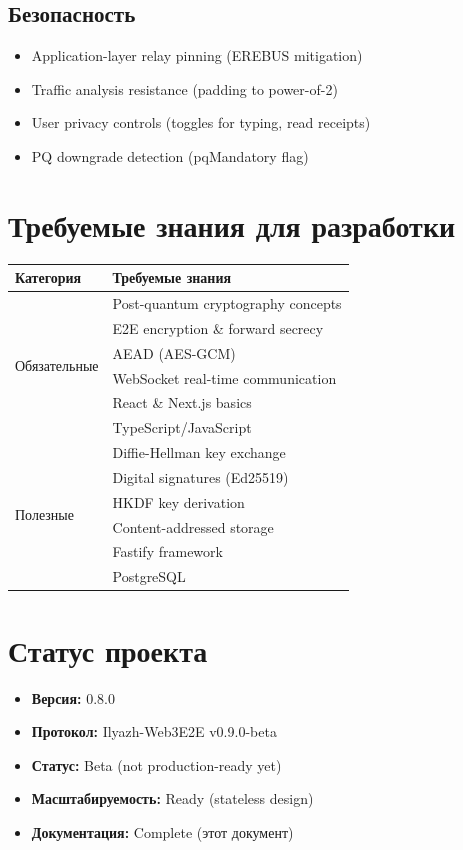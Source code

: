 \documentclass[11pt,a4paper,oneside]{book}
\begin{document}
\vspace{-0.2cm}\subsection{Безопасность}
\begin{itemize}
  \item Application-layer relay pinning (EREBUS mitigation)
  \item Traffic analysis resistance (padding to power-of-2)
  \item User privacy controls (toggles for typing, read receipts)
  \item PQ downgrade detection (pqMandatory flag)
\end{itemize}
\vspace{-0.3cm}\section{Требуемые знания для разработки}
\begin{table}[h]
\centering
\begin{tabular}{|l|l|}
\hline
\textbf{Категория} & \textbf{Требуемые знания} \\
\hline
\multirow{6}{*}{Обязательные} & Post-quantum cryptography concepts \\
& E2E encryption \& forward secrecy \\
& AEAD (AES-GCM) \\
& WebSocket real-time communication \\
& React \& Next.js basics \\
& TypeScript/JavaScript \\
\hline
\multirow{6}{*}{Полезные} & Diffie-Hellman key exchange \\
& Digital signatures (Ed25519) \\
& HKDF key derivation \\
& Content-addressed storage \\
& Fastify framework \\
& PostgreSQL \\
\hline
\end{tabular}
\end{table}
\vspace{-0.3cm}\section{Статус проекта}
\begin{itemize}
  \item \textbf{Версия:} 0.8.0
  \item \textbf{Протокол:} Ilyazh-Web3E2E v0.9.0-beta
  \item \textbf{Статус:} Beta (not production-ready yet)
  \item \textbf{Масштабируемость:} Ready (stateless design)
  \item \textbf{Документация:} Complete (этот документ)
\end{itemize}
\end{document}
